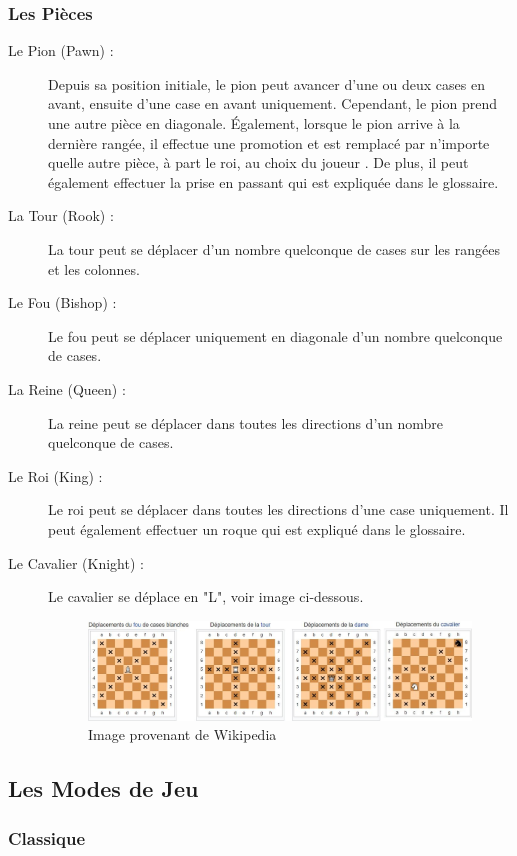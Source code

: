 \documentclass[10pt, a4paper]{article}
\begin{document}
			\subsubsection{Les Pièces}
			\begin{description}
		  \item[Le Pion (Pawn) :] Depuis sa position initiale, le pion peut avancer d'une ou deux cases en avant, ensuite d'une case en avant uniquement. Cependant, le pion prend une autre pièce en diagonale. Également, lorsque le pion arrive à la dernière rangée, il effectue une promotion et est remplacé par n'importe quelle autre pièce, à part le roi, au choix du joueur \label{promote}. De plus, il peut également effectuer la prise en passant qui est expliquée dans le glossaire.
			\item[La Tour (Rook) :] La tour peut se déplacer d'un nombre quelconque de cases sur les rangées et les colonnes.
			\item[Le Fou (Bishop) :] Le fou peut se déplacer uniquement en diagonale d'un nombre quelconque de cases.
			\item[La Reine (Queen) :] La reine peut se déplacer dans toutes les directions d'un nombre quelconque de cases.
			\item[Le Roi (King) :] Le roi peut se déplacer dans toutes les directions d'une case uniquement. Il peut également effectuer un roque qui est expliqué dans le glossaire.
			\item[Le Cavalier (Knight) :] Le cavalier se déplace en "L", voir image ci-dessous.
			\begin{figure}[bh]
			\centering
			\includegraphics[scale=0.50]{pieces_move.png}
			\caption{Image provenant de Wikipedia}
			\end{figure}
			\end{description}
			\clearpage

			\subsection{Les Modes de Jeu}
				\subsubsection{Classique}
\end{document}

